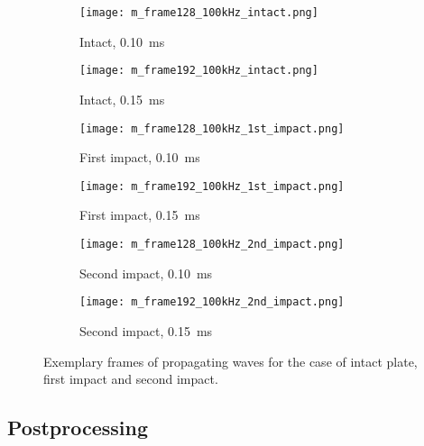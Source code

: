 \documentclass[times,final]{elsarticle}
\begin{document}
\begin{figure} [h!]
	\centering
		\begin{subfigure}[b]{0.49\textwidth}
		\texttt{[image: m\_frame128\_100kHz\_intact.png]}
		\caption{Intact, \SI{0.10}{\milli\second}}
		\label{fig:frame128_intact}
	\end{subfigure}
	\begin{subfigure}[b]{0.49\textwidth}
		\texttt{[image: m\_frame192\_100kHz\_intact.png]}
		\caption{Intact, \SI{0.15}{\milli\second}}
		\label{fig:frame192_intact}
	\end{subfigure}
	\begin{subfigure}[b]{0.49\textwidth}
		\texttt{[image: m\_frame128\_100kHz\_1st\_impact.png]}
		\caption{First impact, \SI{0.10}{\milli\second}}
		\label{fig:frame128_1st_impact}
	\end{subfigure}
	\begin{subfigure}[b]{0.49\textwidth}
		\texttt{[image: m\_frame192\_100kHz\_1st\_impact.png]}
		\caption{First impact, \SI{0.15}{\milli\second}}
		\label{fig:frame192_1st_impact}
	\end{subfigure}
	\begin{subfigure}[b]{0.49\textwidth}
		\texttt{[image: m\_frame128\_100kHz\_2nd\_impact.png]}
		\caption{Second impact, \SI{0.10}{\milli\second}}
		\label{fig:frame128_2nd_impact}
	\end{subfigure}
	\begin{subfigure}[b]{0.49\textwidth}
		\texttt{[image: m\_frame192\_100kHz\_2nd\_impact.png]}
		\caption{Second impact, \SI{0.15}{\milli\second}}
		\label{fig:frame192_2nd_impact}
	\end{subfigure}
	\caption{Exemplary frames of propagating waves for the case of intact plate, first impact and second impact.}
	\label{fig:frames}
\end{figure}

\subsection{Postprocessing}
\end{document}
